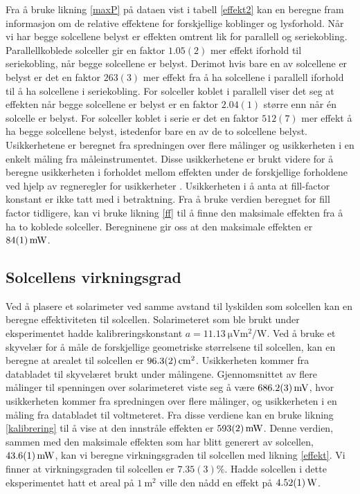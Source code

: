 \documentclass[%
 reprint,
 amsmath,amssymb,
 aps,
 norsk,
 booktabs
]{revtex4-1}
\begin{document}
Fra å bruke likning \eqref{maxP} på dataen vist i tabell \vref{effekt2} kan en beregne fram informasjon om de relative effektene for forskjellige koblinger og lysforhold. Når vi har begge solcellene belyst er effekten omtrent lik for parallell og seriekobling. Parallellkoblede solceller gir en faktor $1.05(2)$ mer effekt iforhold til seriekobling, når begge solcellene er belyst. Derimot hvis bare en av solcellene er belyst er det en faktor $263(3)$ mer effekt fra å ha solcellene i parallell iforhold til å ha solcellene i seriekobling. For solceller koblet i parallell viser det seg at effekten når begge solcellene er belyst er en faktor $2.04(1)$ større enn når én solcelle er belyst. For solceller koblet i serie er det en faktor $512(7)$ mer effekt å ha begge solcellene belyst, istedenfor bare en av de to solcellene belyst. Usikkerhetene er beregnet fra spredningen over flere målinger og usikkerheten i en enkelt måling fra måleinstrumentet. Disse usikkerhetene er brukt videre for å beregne usikkerheten i forholdet mellom effekten under de forskjellige forholdene ved hjelp av regneregler for usikkerheter \cite{squires}. Usikkerheten i å anta at fill-factor konstant er ikke tatt med i betraktning. Fra å bruke verdien beregnet for fill factor tidligere, kan vi bruke likning \eqref{ff} til å finne den maksimale effekten fra å ha to koblede solceller. Beregninene gir oss at den maksimale effekten er $\SI{84\pm1}{\milli\watt}$.
\subsection{Solcellens virkningsgrad}
Ved å plasere et solarimeter ved samme avstand til lyskilden som solcellen kan en beregne effektiviteten til solcellen. Solarimeteret som ble brukt under eksperimentet hadde kalibreringskonstant $a=\SI{11.13}{\micro\volt\meter^2\per\watt}$. Ved å bruke et skyvelær for å måle de forskjellige geometriske størrelsene til solcellen, kan en beregne at arealet til solcellen er $\SI{96.3\pm0.2}{\centi\meter^2}$. Usikkerheten kommer fra databladet til skyvelæret brukt under målingene. Gjennomsnittet av flere målinger til spenningen over solarimeteret viste seg å være $\SI{686.2\pm0.3}{\milli\volt}$, hvor usikkerheten kommer fra spredningen over flere målinger, og usikkerheten i en måling fra databladet til voltmeteret. Fra disse verdiene kan en bruke likning \eqref{kalibrering} til å vise at den innstråle effekten er
$\SI{593\pm2}{\milli\watt}$. Denne verdien, sammen med den maksimale effekten som har blitt generert av solcellen, $\SI{43.6\pm0.1}{\milli\watt}$, kan vi beregne virkningsgraden til solcellen med likning \eqref{effekt}. Vi finner at virkningsgraden til solcellen er $7.35(3)\%$. Hadde solcellen i dette eksperimentet hatt et areal på $\SI{1}{\meter^2}$ ville den nådd en effekt på $\SI{4.52\pm0.01}{\watt}$.
\end{document}
